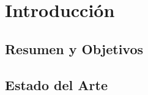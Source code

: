 \documentclass[main.tex]{subfiles}
\begin{document}
		
	\chapter[Introducción]{Introducción}
	\section[Resumen]{Resumen y Objetivos}	
	\lipsum[3-5]
	\section[Estado del Arte]{Estado del Arte}
	\lipsum[7-9]
	\newpage
\end{document}
